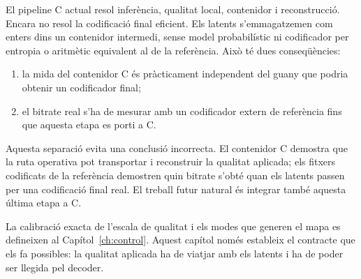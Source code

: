 El pipeline C actual resol inferència, qualitat local, contenidor i
reconstrucció. Encara no resol la codificació final eficient. Els latents
s'emmagatzemen com enters dins un contenidor intermedi, sense model
probabilístic ni codificador per entropia o aritmètic equivalent al de la
referència. Això té dues conseqüències:

\begin{enumerate}[leftmargin=*]
  \item la mida del contenidor C és pràcticament independent del guany que
  podria obtenir un codificador final;
  \item el bitrate real s'ha de mesurar amb un codificador extern de referència
  fins que aquesta etapa es porti a C.
\end{enumerate}

Aquesta separació evita una conclusió incorrecta. El contenidor C demostra que
la ruta operativa pot transportar i reconstruir la qualitat aplicada; els
fitxers codificats de la referència demostren quin bitrate s'obté quan els
latents passen per una codificació final real. El treball futur natural és
integrar també aquesta última etapa a C.

La calibració exacta de l'escala de qualitat i els modes que generen el mapa es
defineixen al Capítol~\ref{ch:control}. Aquest capítol només estableix el
contracte que els fa possibles: la qualitat aplicada ha de viatjar amb els
latents i ha de poder ser llegida pel decoder.
